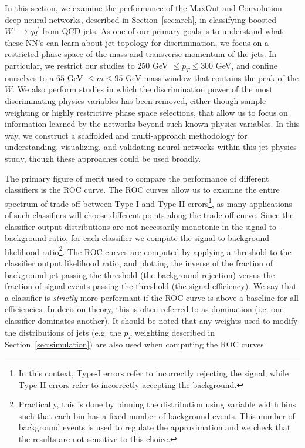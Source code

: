 
In this section, we examine the performance of the MaxOut and Convolution deep neural networks, described in Section~\ref{sec:arch}, in classifying boosted $W^\pm \to q q^\prime$ from QCD jets.  As one of our primary goals is to understand  what these NN's can learn about jet topology for discrimination, we focus on a restricted phase space of the mass and transverse momentum of the jets.  In particular, we restrict our studies to $250$ GeV $\leq p_T \leq 300$ GeV, and confine ourselves to a $65$ GeV $\leq m \leq 95$ GeV mass window that contains the peak of the $W$.   We also perform studies in which the discrimination power of the most discriminating physics variables has been removed, either though sample weighting or highly restrictive phase space selections, that allow us to focus on information learned by the networks beyond such known physics variables.  In this way, we construct a scaffolded and multi-approach methodology for understanding, visualizing, and validating neural networks within this jet-physics study, though these approaches could be used broadly.

The primary figure of merit used to compare the performance of different classifiers is the ROC curve.  The ROC curves allow us to examine the entire spectrum of trade-off between Type-I and Type-II errors\footnote{In this context, Type-I errors refer to incorrectly rejecting the signal, while Type-II errors refer to incorrectly accepting the background.}, as many applications of such classifiers will choose different points along the trade-off curve.   Since the classifier output distributions are not necessarily monotonic in the signal-to-background ratio, for each classifier we compute the  signal-to-background likelihood ratio\footnote{Practically, this is done by binning the distribution using variable width bins such that each bin has a fixed number of background events.  This number of background events is used to regulate the approximation and we check that the results are not sensitive to this choice.}.  The ROC curves are computed by applying a threshold to the classifier output likelihood ratio, and plotting the inverse of the fraction of background jet passing the threshold (the background rejection) versus the fraction of signal events passing the threshold (the signal efficiency).  We say that a classifier is \emph{strictly} more performant if the ROC curve is above a baseline for all efficiencies.  In decision theory, this is often referred to as domination (i.e. one classifier dominates another). It should be noted that any weights used to modify the distributions of jets (e.g. the $p_{T}$ weighting described in Section~\ref{sec:simulation}) are also used when computing the ROC curves.

